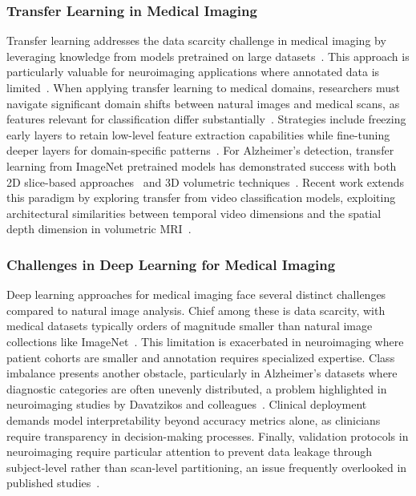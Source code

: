\documentclass[12pt, a4paper]{article}
\begin{document}
\subsubsection{Transfer Learning in Medical Imaging}

Transfer learning addresses the data scarcity challenge in medical imaging by leveraging knowledge from models pretrained on large datasets~\cite{hon2017towards}. This approach is particularly valuable for neuroimaging applications where annotated data is limited~\cite{ebrahimi2019transfer}. When applying transfer learning to medical domains, researchers must navigate significant domain shifts between natural images and medical scans, as features relevant for classification differ substantially~\cite{mehmood2021transfer}. Strategies include freezing early layers to retain low-level feature extraction capabilities while fine-tuning deeper layers for domain-specific patterns~\cite{acharya2021alzheimer}. For Alzheimer's detection, transfer learning from ImageNet pretrained models has demonstrated success with both 2D slice-based approaches~\cite{hon2017towards,maqsood2019transfer} and 3D volumetric techniques~\cite{ebrahimi2020introducing}. Recent work extends this paradigm by exploring transfer from video classification models, exploiting architectural similarities between temporal video dimensions and the spatial depth dimension in volumetric MRI~\cite{wu20223d}.

\subsubsection{Challenges in Deep Learning for Medical Imaging}

Deep learning approaches for medical imaging face several distinct challenges compared to natural image analysis. Chief among these is data scarcity, with medical datasets typically orders of magnitude smaller than natural image collections like ImageNet~\cite{litjens2017survey}. This limitation is exacerbated in neuroimaging where patient cohorts are smaller and annotation requires specialized expertise. Class imbalance presents another obstacle, particularly in Alzheimer's datasets where diagnostic categories are often unevenly distributed, a problem highlighted in neuroimaging studies by Davatzikos and colleagues~\cite{davatzikos2019machine}. Clinical deployment demands model interpretability beyond accuracy metrics alone, as clinicians require transparency in decision-making processes. Finally, validation protocols in neuroimaging require particular attention to prevent data leakage through subject-level rather than scan-level partitioning, an issue frequently overlooked in published studies~\cite{litjens2017survey}.
\end{document}
